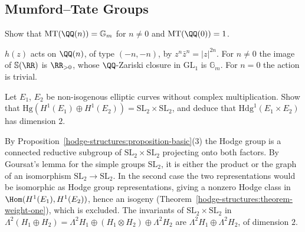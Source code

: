 \subsection{Mumford--Tate Groups}\label{hodge-structures:subsection-exercises-mumford-tate}

\begin{exercise}\label{hodge-structures:exercise-tate}
Show that $\mathrm{MT}(\QQ(n)) = \mathbb{G}_m$ for $n \neq 0$ and $\mathrm{MT}(\QQ(0)) = 1$.
\end{exercise}

\begin{solution}
$h(z)$ acts on $\QQ(n)$, of type $(-n, -n)$, by $z^n\bar z^n = |z|^{2n}$. For $n \neq 0$ the image of $\mathbb{S}(\RR)$ is $\RR_{>0}$, whose $\QQ$-Zariski closure in $\mathrm{GL}_1$ is $\mathbb{G}_m$. For $n = 0$
the action is trivial.
\end{solution}

\begin{exercise}\label{hodge-structures:exercise-product-elliptic}
Let $E_1$, $E_2$ be non-isogenous elliptic curves without complex multiplication. Show that $\mathrm{Hg}(H^1(E_1) \oplus H^1(E_2)) = \mathrm{SL}_2 \times \mathrm{SL}_2$, and deduce that
$\mathrm{Hdg}^1(E_1 \times E_2)$ has dimension $2$.
\end{exercise}

\begin{solution}
By Proposition~\ref{hodge-structures:proposition-basic}(3) the Hodge group is a connected reductive subgroup of $\mathrm{SL}_2 \times \mathrm{SL}_2$ projecting onto both factors. By Goursat's lemma for the
simple groups $\mathrm{SL}_2$, it is either the product or the graph of an isomorphism $\mathrm{SL}_2 \to \mathrm{SL}_2$. In the second case the two representations would be isomorphic as Hodge
group representations, giving a nonzero Hodge class in $\Hom(H^1(E_1), H^1(E_2))$, hence an isogeny (Theorem~\ref{hodge-structures:theorem-weight-one}), which is excluded. The invariants of
$\mathrm{SL}_2 \times \mathrm{SL}_2$ in $\Lambda^2(H_1 \oplus H_2) = \Lambda^2H_1 \oplus (H_1 \otimes H_2) \oplus \Lambda^2H_2$ are $\Lambda^2H_1 \oplus \Lambda^2H_2$, of dimension $2$.
\end{solution}
